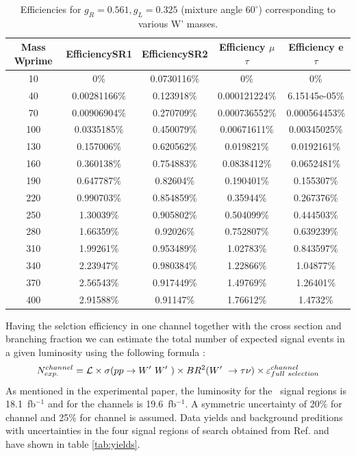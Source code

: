 \begin{table}[htb]
  \centering
  \begin{tabular}{|ccccc|}
    \hline 
    Mass Wprime & EfficiencySR1 & EfficiencySR2 & Efficiency $\mu$$\tau$ & Efficiency e $\tau$ \\
    \hline 
    10& 0\%& 0.0730116\%& 0\%& 0\%\\ 
    40& 0.00281166\%& 0.123918\%& 0.000121224\%& 6.15145e-05\%\\ 
    70& 0.00906904\%& 0.270709\%& 0.000736552\%& 0.000564453\%\\ 
    100& 0.0335185\%& 0.450079\%& 0.00671611\%& 0.00345025\%\\ 
    130& 0.157006\%& 0.620562\%& 0.019821\%& 0.0192161\%\\ 
    160& 0.360138\%& 0.754883\%& 0.0838412\%& 0.0652481\%\\ 
    190& 0.647787\%& 0.82604\%& 0.190401\%& 0.155307\%\\ 
    220& 0.990703\%& 0.854859\%& 0.35944\%& 0.267376\%\\ 
    250& 1.30039\%& 0.905802\%& 0.504099\%& 0.444503\%\\ 
    280& 1.66359\%& 0.92026\%& 0.752807\%& 0.639239\%\\ 
    310& 1.99261\%& 0.953489\%& 1.02783\%& 0.843597\%\\ 
    340& 2.23947\%& 0.980384\%& 1.22866\%& 1.04877\%\\ 
    370& 2.56543\%& 0.917449\%& 1.49769\%& 1.26401\%\\ 
    400& 2.91588\%& 0.91147\%& 1.76612\%& 1.4732\%\\ 
    \hline
  \end{tabular}
  \caption{Efficiencies for  $ g_R=0.561 , g_L=0.325$  (mixture angle $60^\circ$) corresponding to various W' masses. \label{eff-mix60} }
\end{table}
 
Having the selction efficiency in one channel together with the cross section and branching fraction we can estimate the total number of expected signal events in a given luminosity using the following formula :
\begin{equation}
N^{channel}_{exp.}= \mathcal{L} \times \sigma(pp \to W^\prime~W^\prime~) \times BR^{2}(W^\prime~ \to \tau \nu) \times \varepsilon^{channel}_{full~selection}
\end{equation}
As mentioned in the experimental paper, the luminosity for the \tauTau ~signal regions is 18.1~fb$^{-1}$ and for the \lepTau channels is 19.6~fb$^{-1}$. A symmetric uncertainty of 20\% for \lepTau channel and 25\% for \tauTau channel is assumed. Data yields and background preditions with uncertainties in the four signal regions of search obtained from Ref.\cite{Khachatryan:2016trj} and have shown in table \ref{tab:yields}. 

